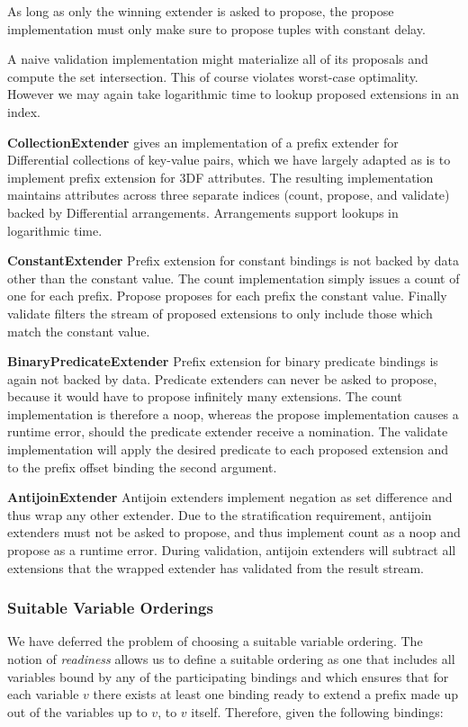 \documentclass[../index.tex]{subfiles}
\begin{document}
As long as only the winning extender is asked to propose, the propose
implementation must only make sure to propose tuples with constant
delay.

A naive validation implementation might materialize all of its
proposals and compute the set intersection. This of course violates
worst-case optimality. However we may again take logarithmic time to
lookup proposed extensions in an index.

\textbf{CollectionExtender} \cite{dogsdogsdogs} gives an
implementation of a prefix extender for Differential collections of
key-value pairs, which we have largely adapted as is to implement
prefix extension for 3DF attributes. The resulting implementation
maintains attributes across three separate indices (count, propose,
and validate) backed by Differential arrangements. Arrangements
support lookups in logarithmic time.

\textbf{ConstantExtender} Prefix extension for constant bindings is
not backed by data other than the constant value. The count
implementation simply issues a count of one for each prefix. Propose
proposes for each prefix the constant value. Finally validate filters
the stream of proposed extensions to only include those which match
the constant value.

\textbf{BinaryPredicateExtender} Prefix extension for binary predicate
bindings is again not backed by data. Predicate extenders can never be
asked to propose, because it would have to propose infinitely many
extensions. The count implementation is therefore a noop, whereas the
propose implementation causes a runtime error, should the predicate
extender receive a nomination. The validate implementation will apply
the desired predicate to each proposed extension and to the prefix
offset binding the second argument.

\textbf{AntijoinExtender} Antijoin extenders implement negation as set
difference and thus wrap any other extender. Due to the stratification
requirement, antijoin extenders must not be asked to propose, and thus
implement count as a noop and propose as a runtime error. During
validation, antijoin extenders will subtract all extensions that the
wrapped extender has validated from the result stream.

\subsubsection{Suitable Variable Orderings}

We have deferred the problem of choosing a suitable variable
ordering. The notion of \emph{readiness} allows us to define a
suitable ordering as one that includes all variables bound by any of
the participating bindings and which ensures that for each variable
$v$ there exists at least one binding ready to extend a prefix made up
out of the variables up to $v$, to $v$ itself. Therefore, given the
following bindings:
\end{document}
